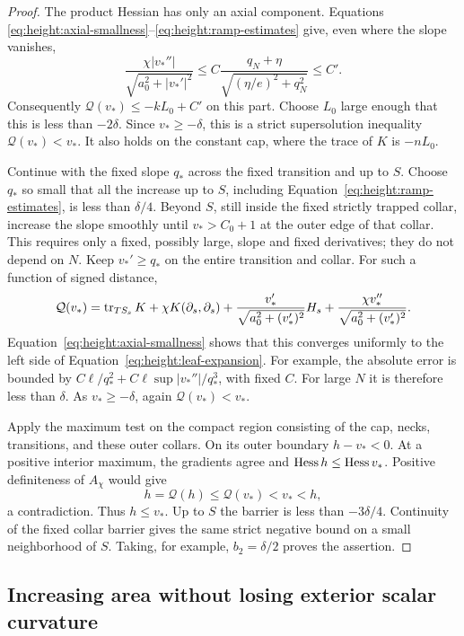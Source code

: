 \begin{proof}
The product Hessian has only an axial component.  Equations
\eqref{eq:height:axial-smallness}--\eqref{eq:height:ramp-estimates}
give, even where the slope vanishes,
\[
 \frac{\chi|v_*''|}{\sqrt{a_0^2+|v_*'|^2}}
 \le C\frac{q_N+\eta}{\sqrt{(\eta/e)^2+q_N^2}}\le C'.
\]
Consequently $\mathcal Q(v_*)\le-kL_0+C'$ on this part.  Choose
$L_0$ large enough that this is less than $-2\delta$.  Since
$v_*\ge-\delta$, this is a strict supersolution inequality
$\mathcal Q(v_*)<v_*$.  It also holds on the constant cap, where the
trace of $K$ is $-nL_0$.

Continue with the fixed slope $q_*$ across the fixed transition and up
to $S$.  Choose $q_*$ so small that all the increase up to $S$, including
Equation~\eqref{eq:height:ramp-estimates}, is less than $\delta/4$.
Beyond $S$, still inside the fixed strictly trapped collar, increase the
slope smoothly until $v_*>C_0+1$ at the outer edge of that collar.  This
requires only a fixed, possibly large, slope and fixed derivatives;
they do not depend on $N$.  Keep $v_*'\ge q_*$ on the entire transition
and collar.  For such a function of signed distance,
\[
 \mathcal Q(v_*)=
 \operatorname{tr}_{TS_s}K+\chi K(\partial_s,\partial_s)
 +\frac{v_*'}{\sqrt{a_0^2+(v_*')^2}}H_s
 +\frac{\chi v_*''}{\sqrt{a_0^2+(v_*')^2}}.
\]
Equation~\eqref{eq:height:axial-smallness} shows that this converges
uniformly to the left side of Equation~\eqref{eq:height:leaf-expansion}.
For example, the absolute error is bounded by
$C\ell/q_*^2+C\ell\sup|v_*''|/q_*^3$, with fixed $C$.
For large $N$ it is therefore less than $\delta$.  As
$v_*\ge-\delta$, again $\mathcal Q(v_*)<v_*$.

Apply the maximum test on the compact region consisting of the cap,
necks, transitions, and these outer collars.  On its outer boundary
$h-v_*<0$.  At a positive interior maximum, the gradients agree and
$\operatorname{Hess} h\le\operatorname{Hess} v_*$.  Positive definiteness of $A_\chi$ would give
\[
 h=\mathcal Q(h)\le\mathcal Q(v_*)<v_*<h,
\]
a contradiction.  Thus $h\le v_*$.  Up to $S$ the barrier is less
than $-3\delta/4$.  Continuity of the fixed collar barrier gives the
same strict negative bound on a small neighborhood of $S$.  Taking,
for example, $b_2=\delta/2$ proves the assertion.
\end{proof}

\subsection{Increasing area without losing exterior scalar curvature}

